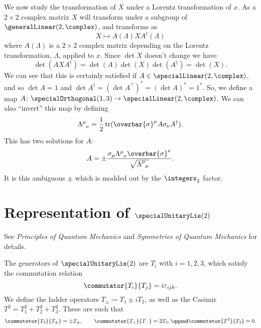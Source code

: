 \documentclass[fleqn]{NotesClass}
\newcommand{\course}[1]{\textit{#1}}
\newcommand{\cyclicGroupZ}[1][n]{\integers_{#1}}
\newcommand{\hermit}{\dagger}
\newcommand{\trans}{\top}
\DeclareMathOperator{\tr}{tr}
\begin{document}
    We now study the transformation of \(X\) under a Lorentz transformation of \(x\).
    As a \(2 \times 2\) complex matrix \(X\) will transform under a subgroup of \(\generalLinear(2, \complex)\), and transforms as
    \begin{equation}
        X \mapsto A(\Lambda) X A^\hermit(\Lambda)
    \end{equation}
    where \(A(\Lambda)\) is a \(2 \times 2\) complex matrix depending on the Lorentz transformation, \(\Lambda\), applied to \(x\).
    Since \(\det X\) doesn't change we have
    \begin{equation}
        \det(AXA^\hermit) = \det(A)\det(X)\det(A^\hermit) = \det(X).
    \end{equation}
    We can see that this is certainly satisfied if \(A \in \specialLinear(2, \complex)\), and so \(\det A = 1\) and \(\det A^\hermit = (\det A^\trans)^* = (\det A)^* = 1^*\).
    So, we define a map \(A \colon \specialOrthogonal(1, 3) \to \specialLinear(2, \complex)\).
    We can also \enquote{invert} this map by defining
    \begin{equation}
        \tensor{\Lambda}{^\mu_\nu} = \frac{1}{2} \tr(\overbar{\sigma}^\mu A \sigma_\nu A^\hermit).
    \end{equation}
    This has two solutions for \(A\):
    \begin{equation}
        A = \pm \frac{\sigma_\mu \tensor{\Lambda}{^\mu_\nu}\overbar{\sigma}^\nu}{\sqrt{\tensor{\Lambda}{^\mu_\mu}}}.
    \end{equation}
    It is this ambiguous \(\pm\) which is modded out by the \(\cyclicGroupZ[2]\) factor.
    
    \section{Representation of \texorpdfstring{\(\specialUnitaryLie(2)\)}{su(2)}}
    \begin{rmk}
        See \course{Principles of Quantum Mechanics} and \course{Symmetries of Quantum Mechanics} for details.
    \end{rmk}
    The generators of \(\specialUnitaryLie(2)\) are \(T_i\) with \(i = 1, 2, 3\), which satisfy the commutation relation
    \begin{equation}
        \commutator{T_i}{T_j} = i\varepsilon_{ijk}.
    \end{equation}
    We define the ladder operators \(T_{\pm} \coloneqq T_1 \pm i T_2\), as well as the Casimir \(T^2 = T_1^2 + T_2^2 + T_3^2\).
    These are such that
    \begin{equation}
        \commutator{T_3}{T_{\pm}} = \pm T_{\pm}, \qquad \commutator{T_+}{T_-} = 2T_3, \qqand \commutator{T^2}{T_3} = 0.
    \end{equation}
    
\end{document}
